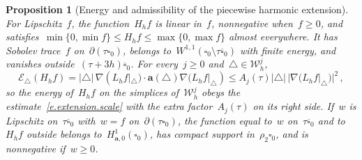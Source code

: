 \documentclass[11pt,letterpaper]{article}
\numberwithin{equation}{section}
\newtheorem{proposition}[theorem]{Proposition}
\theoremstyle{definition}
\renewcommand{\a}{\mathbf{a}}
\newcommand{\cu}{\square}
\newcommand{\Ener}{\mathcal E}
\newcommand{\Hzero}[1]{H^1_{#1,0}}
\begin{document}
\begin{proposition}[Energy and admissibility of the piecewise harmonic extension]
\label{p.whitney.extension}
For Lipschitz~$f$, the function~$H_hf$ is linear in~$f$, nonnegative when~$f\geq0$, and satisfies~$\min\{0,\min f\}\leq H_hf\leq\max\{0,\max f\}$ almost everywhere. It has Sobolev trace~$f$ on~$\partial(\tau\cu_0)$, belongs to~$W^{1,1}(\cu_0\setminus\tau\overline{\cu}_0)$ with finite energy, and vanishes outside~$(\tau+3h)\overline{\cu}_0$. For every~$j\geq0$ and~$\triangle\in\mathscr W_h^j$,
\begin{equation}
	\Ener_\triangle(H_hf)=|\triangle|\,\nabla(L_hf|_\triangle)\cdot\a(\triangle)\nabla(L_hf|_\triangle)\leq A_j(\tau)|\triangle|\,|\nabla(L_hf|_\triangle)|^2\,,
	\label{e.harmonic.energy}
\end{equation}
so the energy of~$H_hf$ on the simplices of~$\mathscr W_h^j$ obeys the estimate~\eqref{e.extension.scale} with the extra factor~$A_j(\tau)$ on its right side. If~$w$ is Lipschitz on~$\tau\overline{\cu}_0$ with~$w=f$ on~$\partial(\tau\cu_0)$, the function equal to~$w$ on~$\tau\overline{\cu}_0$ and to~$H_hf$ outside belongs to~$\Hzero{\a}(\cu_0)$, has compact support in~$\rho_2\cu_0$, and is nonnegative if~$w\geq0$.
\end{proposition}
\end{document}
